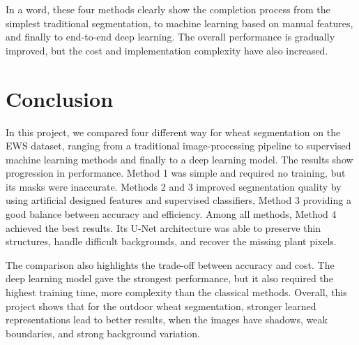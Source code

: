 \documentclass[conference]{IEEEtran}
\begin{document}
In a word, these four methods clearly show the completion process from the simplest traditional segmentation, to machine learning based on manual features, and finally to end-to-end deep learning. The overall performance is gradually improved, but the cost and implementation complexity have also increased.



\section{Conclusion}
In this project, we compared four different way for wheat segmentation on the EWS dataset, ranging from a traditional image-processing pipeline to supervised machine learning methods and finally to a deep learning model. The results show  progression in performance. Method 1 was simple and required no training, but its masks were inaccurate. Methods 2 and 3 improved segmentation quality by using artificial designed features and supervised classifiers, Method 3 providing a good balance between accuracy and efficiency. Among all methods, Method 4 achieved the best results. Its U-Net architecture was able to preserve thin structures, handle difficult backgrounds, and recover the missing plant pixels.  

The comparison also highlights the trade-off between accuracy and cost. The deep learning model gave the strongest performance, but it also required the highest training time, more complexity than the classical methods. Overall, this project shows that for the outdoor wheat segmentation, stronger learned representations lead to better results, when the images have shadows, weak boundaries, and strong background variation.
\end{document}
